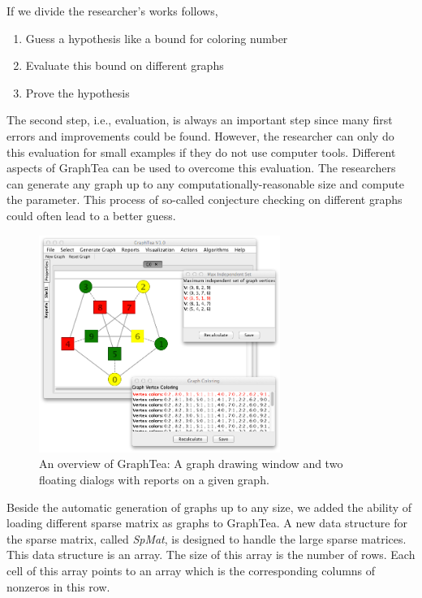 \documentclass[12pt, twoside,a4paper,toc=bibliography]{scrbook}
\begin{document}
If we divide the researcher's works follows,
\begin{enumerate}
\item Guess a hypothesis like a bound for coloring number
\item Evaluate this bound on different graphs
\item Prove the hypothesis
\end{enumerate}
The second step, i.e., evaluation, is always an important step since many first errors and
improvements could be found.
However, the researcher can only do this evaluation for small examples if they do not
use computer tools.
Different aspects of GraphTea can be used to overcome this evaluation.
The researchers can generate any graph up to any computationally-reasonable size
and compute the parameter.
This process of so-called conjecture checking on different graphs could often lead to a better guess.
\begin{figure}
\centering
\includegraphics[width=0.7\textwidth]{graphtea}
\caption{An overview of GraphTea: A graph drawing window and
two floating dialogs with reports on a given graph.}
\label{f.graphtea}
\end{figure}

Beside the automatic generation of graphs up to any size, we added the ability of loading
different sparse matrix as graphs to GraphTea.
A new data structure for the sparse matrix, called \textit{SpMat}, is designed
to handle the large sparse matrices. This data structure is an array.
The size of this array is the number of rows. Each cell of this array points to
an array which is the corresponding columns of nonzeros in this row.
\end{document}
